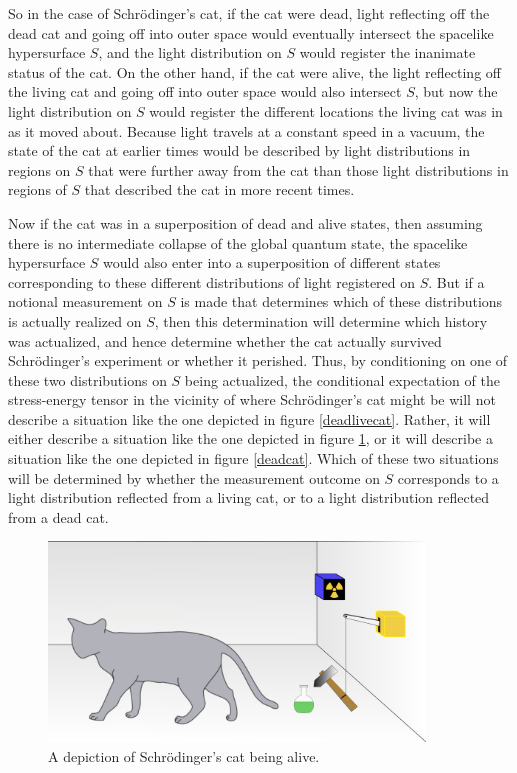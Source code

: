 So in the case of Schr\"{o}dinger's cat, if the cat were dead,  light reflecting off the dead cat and going off into outer space would eventually intersect the spacelike hypersurface $S$, and the light distribution on $S$ would register the inanimate status of the cat. On the other hand, if the cat were alive, the light reflecting off the living cat and going off into outer space would also intersect $S$, but now the light distribution on $S$ would register the different locations the living cat was in as it moved about. Because light travels at a constant speed in a vacuum, the state of the cat at earlier times would be described by light distributions in regions on $S$ that were further away from the cat than those light distributions in regions of $S$ that described the cat in more recent times. 

Now if the cat was in a superposition of dead and alive states, then assuming there is no intermediate collapse of the global quantum state,  the spacelike hypersurface $S$ would also enter into a superposition of different states corresponding to these different distributions of light registered on $S$. But if a notional measurement on $S$ is made that determines which of these distributions is actually realized on $S$, then this determination will determine which history was actualized, and hence determine whether the cat actually survived Schr\"{o}dinger's experiment or whether it perished. Thus, by conditioning on one of these two distributions on $S$ being actualized, the conditional expectation of the stress-energy tensor in the vicinity of where Schr\"{o}dinger's cat might be 
will not describe a situation like the one depicted in figure \ref{deadlivecat}.   Rather, it will either describe a situation like the one depicted in figure \ref{livecat}, or it will describe a situation like the one depicted in figure \ref{deadcat}. Which of these two situations will be determined by whether the measurement outcome on $S$ corresponds to a light distribution reflected from a living cat, or to a light distribution reflected from a dead cat. 
\begin{figure}[ht!]
  \captionsetup{justification=justified}
  \centering
  \includegraphics[width=100mm]{Chapter03/Schrodingers_livecat.png}
  \caption[Caption for LOF]{A depiction of Schr\"{o}dinger's cat being alive.\protect\footnotemark}
  \label{livecat}
  \end{figure}

